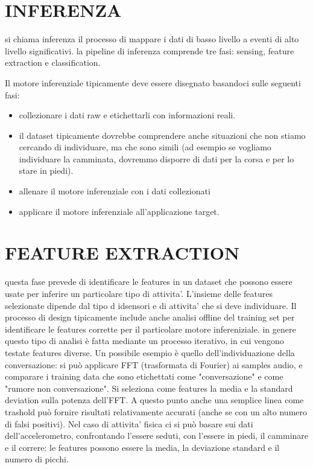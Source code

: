 \documentclass{article}
\begin{document}
\section{INFERENZA}
si chiama inferenza il processo di mappare i dati di basso livello a eventi di alto livello significativi.
la pipeline di inferenza comprende tre fasi: sensing, feature extraction e classification.

Il motore inferenziale tipicamente deve essere disegnato basandoci sulle seguenti fasi:
\begin{itemize}
\item collezionare i dati raw e etichettarli con informazioni reali.
\item il dataset tipicamente dovrebbe comprendere anche situazioni che non stiamo cercando di individuare, ma che sono simili (ad esempio se vogliamo individuare la camminata, dovremmo disporre di dati per la corsa e per lo stare in piedi).
\item allenare il motore inferenziale con i dati collezionati
\item applicare il motore inferenziale all'applicazione target.
\end{itemize}

\section{FEATURE EXTRACTION}
questa fase prevede di identificare le features in un dataset che possono essere usate per inferire un particolare tipo di attivita'.
L'insieme delle features selezionate dipende dal tipo d idsensori e di attivita' che si deve individuare. Il processo di design tipicamente include anche analisi offline del training set per identificare le features corrette per il particolare motore infereniziale. in genere questo tipo di analisi è fatta mediante un processo iterativo, in cui vengono testate features diverse.
Un possibile esempio è quello dell'individuazione della conversazione: si può applicare FFT (trasformata di Fourier) ai samples audio, e comparare i training data che sono etichettati come "conversazione" e come "rumore non conversazione". Si seleziona come features la media e la standard deviation sulla potenza dell'FFT. A questo punto anche una semplice linea come trashold può fornire risultati relativamente accurati (anche se con un alto numero di falsi positivi).
Nel caso di attivita' fisica ci si può basare sui dati dell'accelerometro, confrontando l'essere seduti, con l'essere in piedi, il camminare e il correre: le features possono essere la media, la deviazione standard e il numero di picchi.
\end{document}
